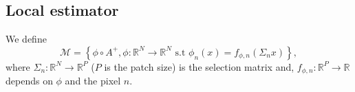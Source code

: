 \documentclass[a4paper,10pt]{article}
\theoremstyle{definition} %
\theoremstyle{definition} %
\theoremstyle{definition} %
\theoremstyle{definition} %
\newcommand{\R}{\mathbb{R}}
\newcommand{\M}{\mathcal{M}}
\newcommand{\0}{\boldsymbol{0}}
\begin{document}
\subsection{Local estimator}
We define 
\begin{equation}
    \M = \left\{\phi \circ A^+, \phi: \R^N \to \R^N \mbox{ s.t } \phi_n(x) = f_{\phi,n}(\Sigma_n x)\right\},
\end{equation}
where $\Sigma_n : \R^N \to \R^P$ ($P$ is the patch size) is the selection matrix and, $f_{\phi, n} : \R^P \to \R$ depends on $\phi$ and the pixel $n$.
\end{document}
